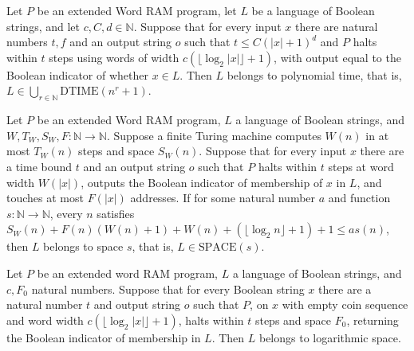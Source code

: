 \begin{theorem}
\label{WordRAM.mem_P_of_decides_logWord}
\leanok
{}
Let $P$ be an extended Word RAM program, let $L$ be a language of Boolean strings, and
let $c,C,d\in\mathbb{N}$. Suppose that for every input $x$ there are natural numbers
$t,f$ and an output string $o$ such that $t\le C(|x|+1)^d$ and $P$ halts within $t$
steps using words of width $c(\lfloor\log_2 |x|\rfloor+1)$, with output equal to the
Boolean indicator of whether $x\in L$. Then $L$ belongs to polynomial time, that is,
$L\in\bigcup_{r\in\mathbb{N}}\mathrm{DTIME}(n^r+1)$.
\end{theorem}

\begin{theorem}
\label{WordRAM.mem_SPACE_of_decides}
\leanok
{}
Let $P$ be an extended Word RAM program, $L$ a language of Boolean strings, and
$W,T_W,S_W,F:\mathbb{N}\to\mathbb{N}$. Suppose a finite Turing machine computes $W(n)$
in at most $T_W(n)$ steps and space $S_W(n)$. Suppose that for every input $x$ there are
a time bound $t$ and an output string $o$ such that $P$ halts within $t$ steps at word
width $W(|x|)$, outputs the Boolean indicator of membership of $x$ in $L$, and touches
at most $F(|x|)$ addresses. If for some natural number $a$ and function
$s:\mathbb{N}\to\mathbb{N}$, every $n$ satisfies
$S_W(n)+F(n)(W(n)+1)+W(n)+(\lfloor\log_2 n\rfloor+1)+1\le a s(n)$, then $L$ belongs to
space $s$, that is, $L\in\mathrm{SPACE}(s)$.
\end{theorem}

\begin{theorem}
\label{WordRAM.mem_LOGSPACE_of_decides}
\leanok
{}
Let $P$ be an extended word RAM program, $L$ a language of Boolean strings, and $c,F_0$
natural numbers. Suppose that for every Boolean string $x$ there are a natural number
$t$ and output string $o$ such that $P$, on $x$ with empty coin sequence and word width
$c(\lfloor\log_2 |x|\rfloor+1)$, halts within $t$ steps and space $F_0$, returning the
Boolean indicator of membership in $L$. Then $L$ belongs to logarithmic space.
\end{theorem}

